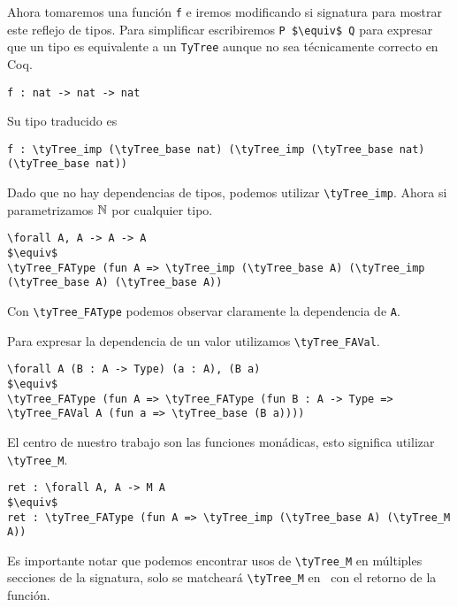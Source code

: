 Ahora tomaremos una función \lstinline{f} e iremos modificando si signatura para mostrar este reflejo de tipos.
Para simplificar escribiremos \lstinline{P $\equiv$ Q} para expresar que un tipo es equivalente a un \lstinline{TyTree} aunque no sea técnicamente correcto en Coq.

\begin{lstlisting}
f : nat -> nat -> nat
\end{lstlisting}

Su tipo traducido es

\begin{lstlisting}
f : \tyTree_imp (\tyTree_base nat) (\tyTree_imp (\tyTree_base nat) (\tyTree_base nat))
\end{lstlisting}

Dado que no hay dependencias de tipos, podemos utilizar \lstinline{\tyTree_imp}. Ahora si parametrizamos
$\mathbb{N}$ por cualquier tipo.

\begin{lstlisting}
\forall A, A -> A -> A
$\equiv$
\tyTree_FAType (fun A => \tyTree_imp (\tyTree_base A) (\tyTree_imp (\tyTree_base A) (\tyTree_base A))
\end{lstlisting}

Con \lstinline{\tyTree_FAType} podemos observar claramente la dependencia de \lstinline{A}.

Para expresar la dependencia de un valor utilizamos \lstinline{\tyTree_FAVal}.

\begin{lstlisting}
\forall A (B : A -> Type) (a : A), (B a)
$\equiv$
\tyTree_FAType (fun A => \tyTree_FAType (fun B : A -> Type => \tyTree_FAVal A (fun a => \tyTree_base (B a))))
\end{lstlisting}

El centro de nuestro trabajo son las funciones monádicas, esto significa utilizar \lstinline{\tyTree_M}.

\begin{lstlisting}
ret : \forall A, A -> M A
$\equiv$
ret : \tyTree_FAType (fun A => \tyTree_imp (\tyTree_base A) (\tyTree_M A))
\end{lstlisting}

Es importante notar que podemos encontrar usos de \lstinline{\tyTree_M} en múltiples secciones de la signatura, solo se matcheará \lstinline{\tyTree_M} en \lift\ con el retorno de la función. 


